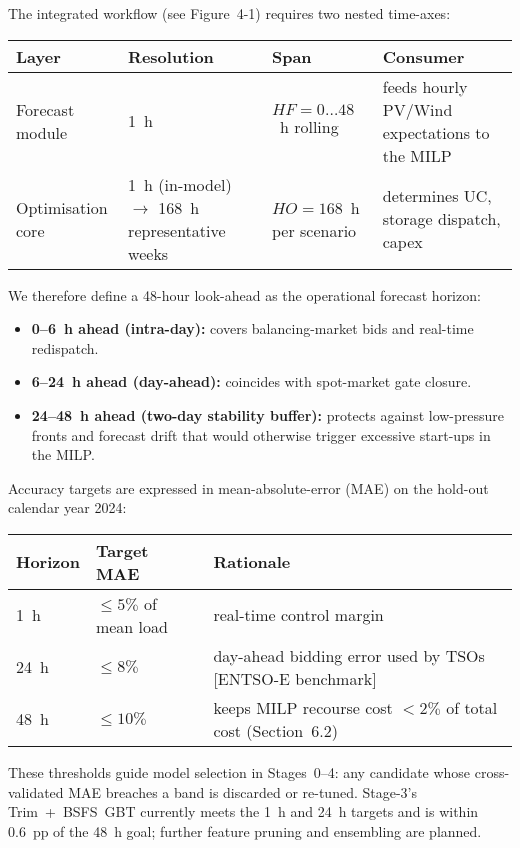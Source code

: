The integrated workflow (see Figure~4-1) requires two nested time-axes:

\begin{center}
\begin{tabular}{llll}
Layer & Resolution & Span & Consumer \\
\hline
Forecast module & 1~h & $HF = 0\ldots48$~h rolling & feeds hourly PV/Wind expectations to the MILP \\
Optimisation core & 1~h (in-model) $\rightarrow$ 168~h representative weeks & $HO = 168$~h per scenario & determines UC, storage dispatch, capex \\
\end{tabular}
\end{center}

We therefore define a 48-hour look-ahead as the operational forecast horizon:
\begin{itemize}
    \item \textbf{0--6~h ahead (intra-day):} covers balancing-market bids and real-time redispatch.
    \item \textbf{6--24~h ahead (day-ahead):} coincides with spot-market gate closure.
    \item \textbf{24--48~h ahead (two-day stability buffer):} protects against low-pressure fronts and forecast drift that would otherwise trigger excessive start-ups in the MILP.
\end{itemize}

Accuracy targets are expressed in mean-absolute-error (MAE) on the hold-out calendar year 2024:

\begin{center}
\begin{tabular}{lll}
Horizon & Target MAE & Rationale \\
\hline
1~h & $\leq 5\%$ of mean load & real-time control margin \\
24~h & $\leq 8\%$ & day-ahead bidding error used by TSOs [ENTSO-E benchmark] \\
48~h & $\leq 10\%$ & keeps MILP recourse cost $<2\%$ of total cost (Section~6.2) \\
\end{tabular}
\end{center}

These thresholds guide model selection in Stages~0--4: any candidate whose cross-validated MAE breaches a band is discarded or re-tuned. Stage-3's Trim~+~BSFS~GBT currently meets the 1~h and 24~h targets and is within 0.6~pp of the 48~h goal; further feature pruning and ensembling are planned.

